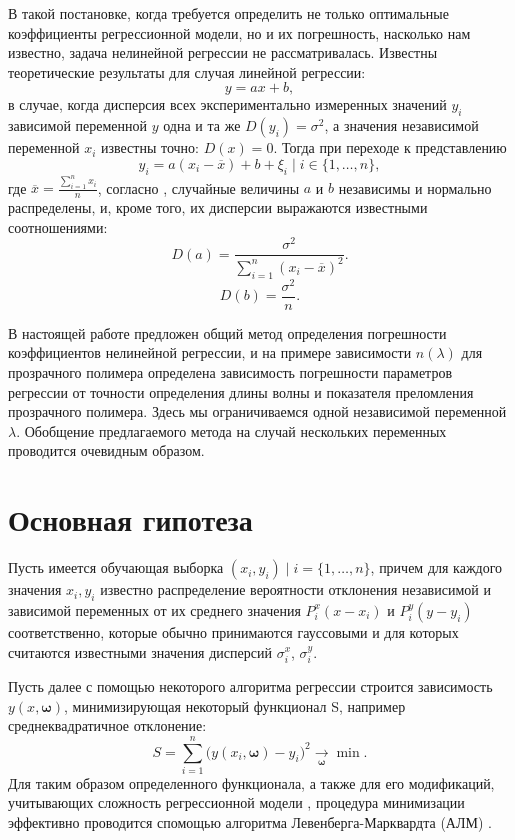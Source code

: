 \documentclass[11pt,a4paper]{article}
\theoremstyle{definition}
\begin{document}
В такой постановке, когда требуется определить не только
оптимальные коэффициенты регрессионной модели, но и их погрешность, насколько нам
известно, задача нелинейной регрессии не рассматривалась. Известны
теоретические результаты для случая линейной регрессии:
\[
  y = ax + b,
\]
в случае, когда дисперсия всех экспериментально измеренных значений $y_i$
зависимой переменной $y$ одна и та же $D(y_i) = \sigma^2$, а значения независимой
переменной $x_i$ известны точно: $D(x) = 0$. Тогда при переходе к представлению
\[
  y_i = a(x_i - \overline{x}) + b + \xi_i \mid i \in \{ 1, \dots, n \},
\]
где $\overline{x} = \frac{\sum_{i = 1}^n x_i}{n}$, согласно \cite{Vatunin05}, случайные величины $a$ и $b$ независимы
и нормально распределены, и, кроме того, их дисперсии выражаются известными соотношениями:
\begin{equation}
  \label{eq:classic_da}
  D(a) = \frac{\sigma^2}{\sum_{i = 1}^n (x_i - \overline{x})^2}.
\end{equation}
\begin{equation}
  \label{eq:classic_db}
  D(b) = \frac{\sigma^2}{n}.
\end{equation}

В настоящей работе предложен общий метод определения
погрешности коэффициентов нелинейной регрессии, и на примере зависимости
$n(\lambda)$ для прозрачного полимера определена зависимость погрешности
параметров регрессии от точности определения длины волны и показателя
преломления прозрачного полимера. Здесь мы ограничиваемся одной
независимой переменной $\lambda$. Обобщение предлагаемого метода на случай
нескольких переменных проводится очевидным образом.

\section{Основная гипотеза}

Пусть имеется обучающая выборка $(x_i, y_i) \mid i = \{ 1, \dots, n \}$,
причем для каждого значения $x_i, y_i$ известно распределение вероятности отклонения
независимой и зависимой переменных от их среднего значения $P_i^x(x - x_i)$ и
$P_i^y (y - y_i)$ соответственно, которые обычно принимаются гауссовыми и для которых
считаются известными значения дисперсий $\sigma_i^x$, $\sigma_i^y$.

Пусть далее с помощью некоторого алгоритма регрессии строится
зависимость $y(x, \boldsymbol{\omega})$, минимизирующая некоторый функционал S,
например среднеквадратичное отклонение:
\begin{equation}
  S = \sum_{i=1}^n \big(y (x_i, \boldsymbol{\omega}) - y_i\big)^2 \underset{\boldsymbol{\omega}}{\rightarrow} \min.
  \label{eq:S}
\end{equation}
Для таким образом определенного функционала, а также для его модификаций,
учитывающих сложность регрессионной модели \cite{Rudoy13}, процедура минимизации эффективно
проводится спомощью алгоритма Левенберга-Марквардта (АЛМ) \cite{Marquardt1963Algorithm,more:78}.
\end{document}
